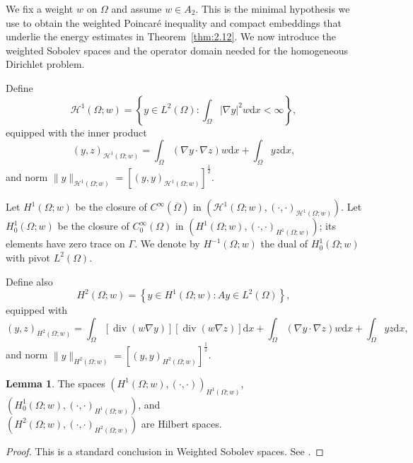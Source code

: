 \documentclass[preprint,12pt]{elsarticle}
\theoremstyle{definition}   %
\newtheorem{lemma}[theorem]{Lemma}
\numberwithin{equation}{section}
\def\ol{\overline}
\def\Om{\Omega}
\def\Ga{\Gamma}
\def\iy{\infty}
\def\f{\frac}
\def\df{\mathrm d}
\def\mcH{\mathcal{H}}
\DeclareMathOperator{\Div}{div}
\begin{document}
We fix a weight $w$ on $\Omega$ and assume $w\in A_2$. This is the minimal hypothesis we use to obtain the weighted Poincar\'e inequality and compact embeddings that underlie the energy estimates in Theorem~\ref{thm:2.12}. We now introduce the weighted Sobolev spaces and the operator domain needed for the homogeneous Dirichlet problem.

Define
\begin{equation*}
	\mathcal{H}^1(\Om;w)=\left\{y\in L^2(\Om)\colon \int_\Om |\nabla y|^2 w\df x<\iy \right\},
\end{equation*}
equipped with the inner product
\begin{equation*}
	(y,z)_{\mcH^1(\Om;w)}=\int_\Om (\nabla y\cdot \nabla z) w\df x+\int_\Om yz\df x,
\end{equation*}
and norm $\|y\|_{\mcH^1(\Om;w)}=\left[(y,y)_{\mcH^1(\Om;w)}\right]^\f{1}{2}$.

Let $H^1(\Om;w)$ be the closure of $C^\iy(\ol\Om)$ in $(\mcH^1(\Om;w), (\cdot,\cdot)_{\mcH^1(\Om;w)})$. Let $H_0^1(\Om;w)$ be the closure of $C_0^\iy(\Om)$ in $(H^1(\Om;w), (\cdot,\cdot)_{H^1(\Om;w)})$; its elements have zero trace on $\Ga$. We denote by $H^{-1}(\Om;w)$ the dual of $H_0^1(\Om;w)$ with pivot $L^2(\Om)$.

Define also
\begin{equation*}
	H^2(\Om;w)=\left\{y\in H^1(\Om;w)\colon A y\in L^2(\Om)\right\},
\end{equation*}
equipped with
\begin{equation*}
	(y,z)_{H^2(\Om;w)}=\int_\Om [\Div (w\nabla y)][\Div(w\nabla z)]\df x+\int_\Om (\nabla y\cdot\nabla z)w\df x+\int_\Om yz\df x,
\end{equation*}
and norm $\|y\|_{H^2(\Om;w)}=\left[(y,y)_{H^2(\Om;w)}\right]^\f{1}{2}$.

\begin{lemma}\label{08.13.L1}
  The spaces $(H^1(\Om;w),(\cdot,\cdot))_{H^1(\Om;w)}$, $(H_0^1(\Om;w),(\cdot,\cdot)_{H^1(\Om;w)})$, and \\
  $(H^2(\Om;w), (\cdot,\cdot)_{H^2(\Om;w)})$ are Hilbert spaces.
\end{lemma}

\begin{proof}
	This is a standard conclusion in Weighted Sobolev spaces. See \cite{GC,Heinonen,Trudinger}.
\end{proof}
\end{document}
